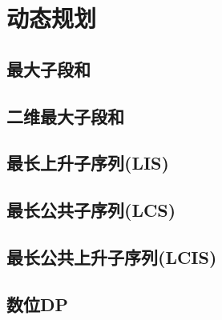 \section{动态规划}
\subsection{最大子段和}


\subsection{二维最大子段和}


\subsection{最长上升子序列(LIS)}


\subsection{最长公共子序列(LCS)}


\subsection{最长公共上升子序列(LCIS)}


\subsection{数位DP}

